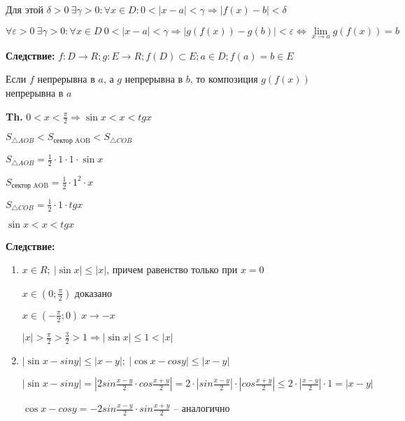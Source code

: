 \documentclass[14pt, letter paper]{article}
\begin{document}
Для этой $\delta > 0\ \exists \gamma > 0 : \forall x \in D : 0 < |x-a| < \gamma \Rightarrow |f(x) - b| < \delta$

$\forall \varepsilon > 0\ \exists \gamma > 0 : \forall x \in D\ 0 < |x-a| < \gamma \Rightarrow |g(f(x)) - g(b)| < \varepsilon \Leftrightarrow \lim\limits_{x \rightarrow a}{g(f(x))} = b$

\textbf{Следствие:} $f : D \rightarrow R; g : E \rightarrow R; f(D) \subset E; a \in D; f(a) = b \in E$

Если $f$ непрерывна в $a$, а $g$ непрерывна в $b$, то композиция $g(f(x))$ непрерывна в $a$

\vspace{5mm}

\textbf{Th.} $0 < x < \frac{\pi}{2} \Rightarrow \sin{x} < x < tgx$

$S_{\triangle AOB} < S_\text{сектор AOB} < S_{\triangle COB}$

$S_{\triangle AOB} = \frac{1}{2} \cdot 1 \cdot 1 \cdot \sin{x}$

$S_\text{сектор AOB} = \frac{1}{2} \cdot 1^2 \cdot x$

$S_{\triangle COB} = \frac{1}{2} \cdot 1 \cdot tg x$

$\sin{x} < x < tgx$

\vspace{5mm}

\textbf{Следствие:} 

\begin{enumerate}
    \item $x \in R;\ |\sin{x}| \leq |x|$, причем равенство только при $x = 0$

    $x \in (0; \frac{\pi}{2})$ доказано

    $x \in (- \frac{\pi}{2}; 0)\ x \rightarrow -x$

    $|x| > \frac{\pi}{2} > \frac{3}{2} > 1 \Rightarrow |\sin{x}| \leq 1 < |x|$

    \item $|\sin{x} - siny| \leq |x - y|;\ |\cos{x} - cosy| \leq |x - y|$

    $|\sin{x} - siny| = |2sin\frac{x-y}{2} \cdot cos\frac{x+y}{2}| = 2 \cdot |sin\frac{x-y}{2}| \cdot |cos\frac{x+y}{2}| \leq 2 \cdot |\frac{x-y}{2}| \cdot 1 = |x - y|$

    $\cos{x} - cosy = -2sin\frac{x-y}{2} \cdot sin\frac{x+y}{2}$ -- аналогично
\end{enumerate}

\vspace{5mm}
\end{document}
